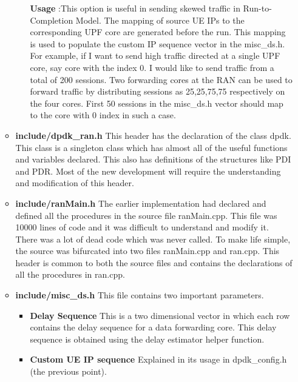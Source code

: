 \documentclass{article}
\begin{document}
\begin{itemize}
\begin{itemize}
\begin{itemize}
                        \textbf{Usage} :This option is useful in sending skewed traffic in Run-to-Completion Model. The
                              mapping of source UE IPs to the corresponding UPF core are generated before the run. This mapping is used to populate
                              the custom IP sequence vector in the misc\_ds.h. For example, if I want to send high traffic directed at a single UPF
                              core, say core with the index 0. I would like to send traffic from a total of 200 sessions. Two forwarding cores at
                              the RAN can be used to forward traffic by distributing sessions as 25,25,75,75 respectively on the four cores. First
                              50 sessions in the misc\_ds.h vector should map to the core with 0 index in such a case.
                    \end{itemize}
              \item \textbf{include/dpdk\_ran.h}
                    This header has the declaration of the class dpdk. This class is a singleton class which has almost all of the useful functions
                    and variables declared. This also has definitions of the structures like PDI and PDR. Most of the new development will require the
                    understanding and modification of this header.
              \item \textbf{include/ranMain.h} The earlier implementation had declared and defined all the  procedures in the source file
                    ranMain.cpp. This file was 10000 lines of code and it was difficult to understand and modify it. There was a lot of dead code
                    which was never called. To make life simple, the source was bifurcated into two files ranMain.cpp and ran.cpp. This header is common to both the source files and contains the declarations of all the procedures in ran.cpp.

              \item \textbf{include/misc\_ds.h} This file contains two important parameters.
                    \begin{itemize}
                        \item \textbf{Delay Sequence} This is a two dimensional vector in which each row contains the delay sequence for a data forwarding core. This delay sequence is obtained using the delay estimator helper function.
                        \item \textbf{Custom UE IP sequence} Explained in its usage in dpdk\_config.h (the previous point).
                    \end{itemize}


\end{itemize}
\end{itemize}
\end{document}
